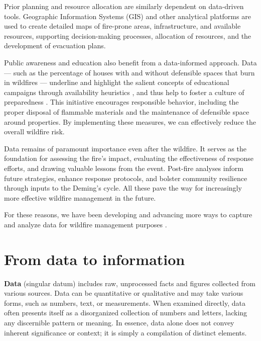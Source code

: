 \documentclass[
  12 pt,
]{Nemilov}
\begin{document}
Prior planning and resource allocation are similarly dependent on data-driven tools. Geographic Information Systems (GIS) and other analytical platforms are used to create detailed maps of fire-prone areas, infrastructure, and available resources, supporting decision-making processes, allocation of resources, and the development of evacuation plans.

Public awareness and education also benefit from a data-informed approach. Data --- such as the percentage of houses with and without defensible spaces that burn in wildfires --- underline and highlight the salient concepts of educational campaigns through availability heuristics \citep{keller1997vividness}, and thus help to foster a culture of preparedness \citep{jakes12003model, sturtevant2006encouraging}. This initiative encourages responsible behavior, including the proper disposal of flammable materials and the maintenance of defensible space around properties. By implementing these measures, we can effectively reduce the overall wildfire risk.

Data remains of paramount importance even after the wildfire. It serves as the foundation for assessing the fire's impact, evaluating the effectiveness of response efforts, and drawing valuable lessons from the event. Post-fire analyses inform future strategies, enhance response protocols, and bolster community resilience through inputs to the Deming's cycle. All these pave the way for increasingly more effective wildfire management in the future.

For these reasons, we have been developing and advancing more ways to capture and analyze data for wildfire management purposes \citep{artes2019global}.

\section{From data to information}\label{from-data-to-information}

\textbf{Data} (singular datum) includes raw, unprocessed facts and figures collected from various sources. Data can be quantitative or qualitative and may take various forms, such as numbers, text, or measurements. When examined directly, data often presents itself as a disorganized collection of numbers and letters, lacking any discernible pattern or meaning. In essence, data alone does not convey inherent significance or context; it is simply a compilation of distinct elements.
\end{document}
